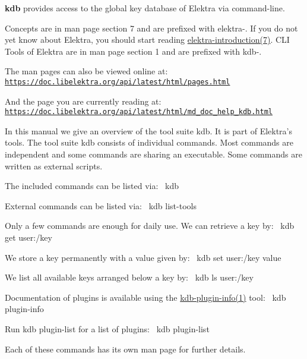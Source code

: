 {\bfseries kdb} provides access to the global key database of Elektra via command-\/line.

Concepts are in man page section 7 and are prefixed with {\ttfamily elektra-\/}. If you do not yet know about Elektra, you should start reading \hyperlink{doc_help_elektra-introduction_md}{elektra-\/introduction(7)}. C\+LI Tools of Elektra are in man page section 1 and are prefixed with {\ttfamily kdb-\/}.

The man pages can also be viewed online at\+: \href{https://doc.libelektra.org/api/latest/html/pages.html}{\tt https\+://doc.\+libelektra.\+org/api/latest/html/pages.\+html}

And the page you are currently reading at\+: \href{https://doc.libelektra.org/api/latest/html/md_doc_help_kdb.html}{\tt https\+://doc.\+libelektra.\+org/api/latest/html/md\+\_\+doc\+\_\+help\+\_\+kdb.\+html}

In this manual we give an overview of the tool suite {\ttfamily kdb}. It is part of Elektra’s tools. The tool suite {\ttfamily kdb} consists of individual commands. Most commands are independent and some commands are sharing an executable. Some commands are written as external scripts.

The included commands can be listed via\+:~\newline
 {\ttfamily kdb}

External commands can be listed via\+:~\newline
 {\ttfamily kdb list-\/tools}

Only a few commands are enough for daily use. We can retrieve a key by\+:~\newline
 {\ttfamily kdb get user\+:/key}

We store a key permanently with a value given by\+:~\newline
 {\ttfamily kdb set user\+:/key value}

We list all available keys arranged below a key by\+:~\newline
 {\ttfamily kdb ls user\+:/key}

Documentation of plugins is available using the \hyperlink{doc_help_kdb-plugin-info_md}{kdb-\/plugin-\/info(1)} tool\+:~\newline
 {\ttfamily kdb plugin-\/info}

Run {\ttfamily kdb plugin-\/list} for a list of plugins\+:~\newline
 {\ttfamily kdb plugin-\/list}

Each of these commands has its own man page for further details.

